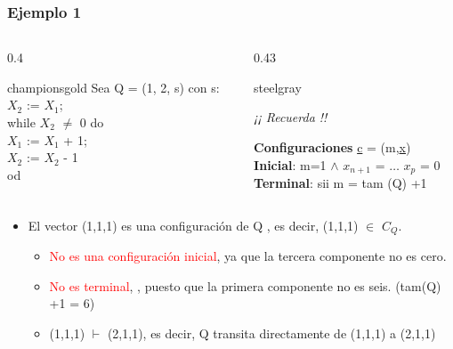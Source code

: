 \documentclass[xcolor=table]{beamer}
\begin{document}
\begin{frame}[fragile]\frametitle{Ejemplo 1} \footnotesize  

\begin{columns}

    \begin{column}{0.4\textwidth}
        \begin{colorblock}[black]{championsgold}{}\scriptsize
        Sea Q = (1, 2, s) con s: \\
        \hspace{0.5cm}   $X_2$ := $X_1$;\\
        \hspace{0.5cm}   while $X_2$ $\neq$ 0 do \\
        \hspace{0.75cm}    $X_1$ := $X_1$ + 1;\\
        \hspace{0.75cm}    $X_2$ := $X_2$ - 1\\
        \hspace{0.5cm}  od
        \end{colorblock}
        \end{column}

    \begin{column}{0.43\textwidth}
        \begin{colorblock}[white]{steelgray}{}\scriptsize
           \begin{center}
               \textit{¡¡ Recuerda !!} \\
           \end{center} 
            \textbf{Configuraciones} \underline{c} = (m,\underline{x})\\
            \textbf{Inicial}: m=1 $\wedge$ $x_{n+1}$ = $\ldots$  $x_p$ = 0\\
            \textbf{Terminal}: sii m = tam (Q) +1
            \end{colorblock}
    \end{column}

    
    
\end{columns}


\begin{itemize}
\scriptsize
    \item El vector (1,1,1) es una configuración de Q , es decir, (1,1,1) $\in$ $C_Q$.

        \begin{itemize}   \tiny
            \item \textcolor{red}{No es una configuración inicial}, ya que la tercera componente no es cero.
            \item \textcolor{red}{No es terminal}, , puesto que la primera componente no es seis. (tam(Q) +1 = 6)
            \item (1,1,1) $\vdash$ (2,1,1), es decir, Q transita directamente de (1,1,1) a (2,1,1)
        \end{itemize}


\end{itemize}
\end{frame}
\end{document}
